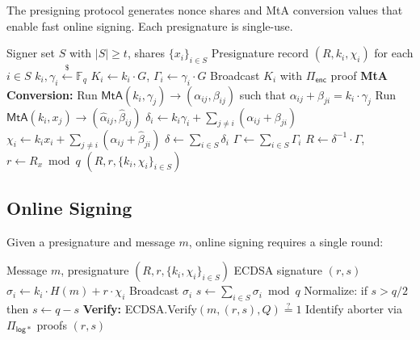 \documentclass[11pt,twocolumn]{article}
\begin{document}
The presigning protocol generates nonce shares and MtA conversion values that enable
fast online signing. Each presignature is single-use.

\begin{algorithm}[H]
\caption{CGGMP21 Presigning}
\label{alg:cggmp-presign}
\begin{algorithmic}[1]
\Require Signer set $S$ with $|S| \geq t$, shares $\{x_i\}_{i \in S}$
\Ensure Presignature record $(R, k_i, \chi_i)$ for each $i \in S$
  \State $k_i, \gamma_i \xleftarrow{\$} \mathbb{F}_q$
  \State $K_i \gets k_i \cdot G$, $\Gamma_i \gets \gamma_i \cdot G$
  \State Broadcast $K_i$ with $\Pi_{\mathsf{enc}}$ proof
\EndFor
\Statex \textbf{MtA Conversion:}
  \State Run $\mathsf{MtA}(k_i, \gamma_j) \to (\alpha_{ij}, \beta_{ij})$
  \State \quad such that $\alpha_{ij} + \beta_{ji} = k_i \cdot \gamma_j$
  \State Run $\mathsf{MtA}(k_i, x_j) \to (\hat{\alpha}_{ij}, \hat{\beta}_{ij})$
\EndFor
{}
  \State $\delta_i \gets k_i \gamma_i + \sum_{j \neq i} (\alpha_{ij} + \beta_{ji})$
  \State $\chi_i \gets k_i x_i + \sum_{j \neq i} (\hat{\alpha}_{ij} + \hat{\beta}_{ji})$
\EndFor
\State $\delta \gets \sum_{i \in S} \delta_i$ 
\State $\Gamma \gets \sum_{i \in S} \Gamma_i$ 
\State $R \gets \delta^{-1} \cdot \Gamma$, \; $r \gets R_x \bmod q$
\State \Return $(R, r, \{k_i, \chi_i\}_{i \in S})$
\end{algorithmic}
\end{algorithm}

\subsection{Online Signing}

Given a presignature and message $m$, online signing requires a single round:

\begin{algorithm}[H]
\caption{CGGMP21 Online Signing}
\label{alg:cggmp-sign}
\begin{algorithmic}[1]
\Require Message $m$, presignature $(R, r, \{k_i, \chi_i\}_{i \in S})$
\Ensure ECDSA signature $(r, s)$
  \State $\sigma_i \gets k_i \cdot H(m) + r \cdot \chi_i$
  \State Broadcast $\sigma_i$
\EndFor
\State $s \gets \sum_{i \in S} \sigma_i \bmod q$
\State Normalize: if $s > q/2$ then $s \gets q - s$ 
\State \textbf{Verify:} ECDSA.Verify$(m, (r, s), Q) \stackrel{?}{=} 1$
  \State Identify aborter via $\Pi_{\mathsf{log*}}$ proofs 
\EndIf
\State \Return $(r, s)$
\end{algorithmic}
\end{algorithm}
\end{document}
